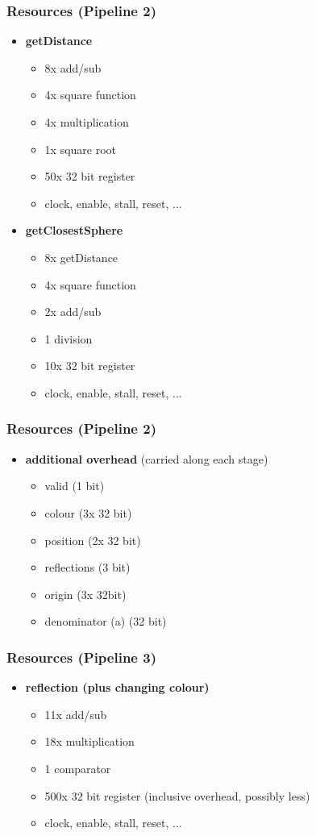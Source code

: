 \documentclass{beamer}
\begin{document}
\begin{frame}
	\frametitle{Resources (Pipeline 2)}
	\begin{itemize}
		\item \textbf{getDistance}
			\begin{itemize}
				\item 8x add/sub
				\item 4x square function
				\item 4x multiplication
				\item 1x square root
				\item 50x 32 bit register
				\item clock, enable, stall, reset, ...
			\end{itemize}
		\item \textbf{getClosestSphere}
			\begin{itemize}
				\item 8x getDistance
				\item 4x square function
				\item 2x add/sub
				\item 1 division
				\item 10x 32 bit register
				\item clock, enable, stall, reset, ...
			\end{itemize}
	\end{itemize}
\end{frame}

\begin{frame}
	\frametitle{Resources (Pipeline 2)}
	\begin{itemize}
		\item \textbf{additional overhead} (carried along each stage)
			\begin{itemize}
				\item valid (1 bit)
				\item colour (3x 32 bit)
				\item position (2x 32 bit)
				\item reflections (3 bit)
				\item origin (3x 32bit)
				\item denominator (a) (32 bit)
			\end{itemize}
	\end{itemize}
\end{frame}

\begin{frame}
	\frametitle{Resources (Pipeline 3)}
	\begin{itemize}
		\item \textbf{reflection (plus changing colour)}
			\begin{itemize}
				\item 11x add/sub
				\item 18x multiplication
				\item 1 comparator
				\item 500x 32 bit register (inclusive overhead, possibly less)
				\item clock, enable, stall, reset, ...
			\end{itemize}
	\end{itemize}
\end{frame}
\end{document}
